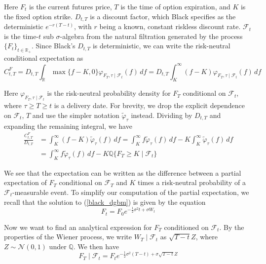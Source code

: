 \documentclass{article}
\numberwithin{equation}{section}
\begin{document}
Here $ F_t $ is the current futures price, $ T $ is the time of option
expiration, and $ K $ is the fixed option strike. $ D_{t, T} $ is a discount
factor, which Black specifies as the deterministic $ e^{-r(T - t)} $, with
$ r $ being a known, constant riskless discount rate. $ \mathcal{F}_t $ is the
time-$ t $ sub $ \sigma $-algebra from the natural filtration generated by the
process $ \{F_t\}_{t \in \mathbb{R}_+} $. Since Black's $ D_{t, T} $ is
deterministic, we can write the risk-neutral conditional expectation as
\begin{equation*}
    C_{t, T}^F = D_{t, T}\int_\mathbb{R}\max\{f - K, 0\}
    \varphi_{F_T, \tau \mid \mathcal{F}_t}(f)\,df =
    D_{t, T}\int_K^\infty(f - K)\varphi_{F_T, \tau \mid \mathcal{F}_t}(f)\,df
\end{equation*}

Here $ \varphi_{F_T, \tau \mid \mathcal{F}_t} $ is the risk-neutral probability
density for $ F_T $ conditional on $ \mathcal{F}_t $, where $ \tau \ge T \ge t $
is a delivery date. For brevity, we drop the explicit dependence on
$ \mathcal{F}_t $, $ T $ and use the simpler notation
$ \widetilde{\varphi}_\tau $ instead. Dividing by $ D_{t, T} $ and expanding the
remaining integral, we have
\begin{equation} \label{black_udE}
    \begin{split}
        \frac{C_{t, T}^F}{D_{t, T}} & = \int_K^\infty(f - K)
        \widetilde{\varphi}_\tau(f)\,df =
        \int_K^\infty f\widetilde{\varphi}_\tau(f)\,df - 
        K\int_K^\infty\widetilde{\varphi}_\tau(f)\,df \\ & =
        \int_K^\infty f\widetilde{\varphi}_\tau(f)\,df - 
        K\mathbb{Q}\{F_T \ge K \mid \mathcal{F}_t\}
    \end{split}
\end{equation}

We see that the expectation can be written as the difference between a partial
expectation of $ F_T $ conditional on $ \mathcal{F}_T $ and $ K $ times a
risk-neutral probability of a $ \mathcal{F}_t $-measurable event. To simplify
our computation of the partial expectation, we recall that the solution to
(\ref{black_dgbm}) is given by the equation
\begin{equation*}
    F_t = F_0e^{-\frac{1}{2}\sigma^2t + \sigma W_t}
\end{equation*}

Now we want to find an analytical expression for $ F_T $ conditioned on
$ \mathcal{F}_t $. By the properties of the Wiener process, we write
$ W_T \mid \mathcal{F}_t $ as $ \sqrt{T - t}Z $, where
$ Z \sim \mathcal{N}(0, 1) $ under $ \mathbb{Q} $. We then have
\begin{equation} \label{black_FT_tad}
    F_T \mid \mathcal{F}_t = F_te^{-\frac{1}{2}\sigma^2(T - t) + 
    \sigma\sqrt{T - t}Z}
\end{equation}
\end{document}
